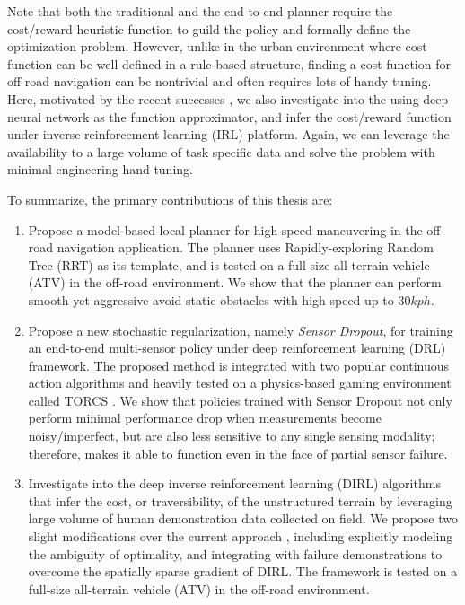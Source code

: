 \documentclass[../thesis.tex]{subfiles}
\begin{document}
Note that both the traditional and the end-to-end planner require the cost/reward heuristic function to guild the policy and formally define the optimization problem. 
However, unlike in the urban environment where cost function can be well defined in a rule-based structure, finding a cost function for off-road navigation can be nontrivial and often requires lots of handy tuning. \cite{silver2010learning}
Here, motivated by the recent successes \cite{wulfmeier2015maximum,wulfmeier2016watch}, we also investigate into the using deep neural network as the function approximator, and infer the cost/reward function under inverse reinforcement learning (IRL) platform. 
Again, we can leverage the availability to a large volume of task specific data and solve the problem with minimal engineering hand-tuning.
 
To summarize, the primary contributions of this thesis are:
\begin{enumerate}
 
    \item %
    Propose a model-based local planner for high-speed maneuvering in the off-road navigation application. 
    The planner uses Rapidly-exploring Random Tree (RRT) \cite{kuffner2000rrt} as its template, and is tested on a full-size all-terrain vehicle (ATV) in the off-road environment. 
    We show that the planner can perform smooth yet aggressive avoid static obstacles with high speed up to $30 kph$.
 
    \item %
    Propose a new stochastic regularization, namely \emph{Sensor Dropout}, for training an end-to-end multi-sensor policy under deep reinforcement learning (DRL) framework. 
    The proposed method is integrated with two popular continuous action algorithms and heavily tested on a physics-based gaming environment called TORCS \cite{wymann2000torcs}. 
    We show that policies trained with Sensor Dropout not only perform minimal performance drop when measurements become noisy/imperfect, but are also less sensitive to any single sensing modality; therefore, makes it able to function even in the face of partial sensor failure.
 
    \item %
    Investigate into the deep inverse reinforcement learning (DIRL) algorithms that infer the cost, or traversibility, of the unstructured terrain by leveraging large volume of human demonstration data collected on field. 
    We propose two slight modifications over the current approach \cite{wulfmeier2015maximum}, including explicitly modeling the ambiguity of optimality, and integrating with failure demonstrations to overcome the spatially sparse gradient of DIRL.
    The framework is tested on a full-size all-terrain vehicle (ATV) in the off-road environment.
 
\end{enumerate}
 
\end{document}
